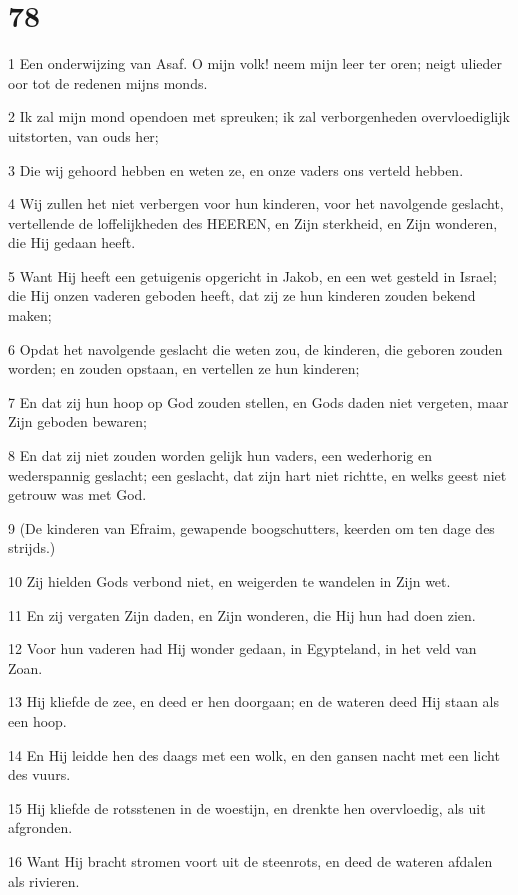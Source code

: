 \chapter{78}

\par 1 Een onderwijzing van Asaf. O mijn volk! neem mijn leer ter oren; neigt ulieder oor tot de redenen mijns monds.
\par 2 Ik zal mijn mond opendoen met spreuken; ik zal verborgenheden overvloediglijk uitstorten, van ouds her;
\par 3 Die wij gehoord hebben en weten ze, en onze vaders ons verteld hebben.
\par 4 Wij zullen het niet verbergen voor hun kinderen, voor het navolgende geslacht, vertellende de loffelijkheden des HEEREN, en Zijn sterkheid, en Zijn wonderen, die Hij gedaan heeft.
\par 5 Want Hij heeft een getuigenis opgericht in Jakob, en een wet gesteld in Israel; die Hij onzen vaderen geboden heeft, dat zij ze hun kinderen zouden bekend maken;
\par 6 Opdat het navolgende geslacht die weten zou, de kinderen, die geboren zouden worden; en zouden opstaan, en vertellen ze hun kinderen;
\par 7 En dat zij hun hoop op God zouden stellen, en Gods daden niet vergeten, maar Zijn geboden bewaren;
\par 8 En dat zij niet zouden worden gelijk hun vaders, een wederhorig en wederspannig geslacht; een geslacht, dat zijn hart niet richtte, en welks geest niet getrouw was met God.
\par 9 (De kinderen van Efraim, gewapende boogschutters, keerden om ten dage des strijds.)
\par 10 Zij hielden Gods verbond niet, en weigerden te wandelen in Zijn wet.
\par 11 En zij vergaten Zijn daden, en Zijn wonderen, die Hij hun had doen zien.
\par 12 Voor hun vaderen had Hij wonder gedaan, in Egypteland, in het veld van Zoan.
\par 13 Hij kliefde de zee, en deed er hen doorgaan; en de wateren deed Hij staan als een hoop.
\par 14 En Hij leidde hen des daags met een wolk, en den gansen nacht met een licht des vuurs.
\par 15 Hij kliefde de rotsstenen in de woestijn, en drenkte hen overvloedig, als uit afgronden.
\par 16 Want Hij bracht stromen voort uit de steenrots, en deed de wateren afdalen als rivieren.
